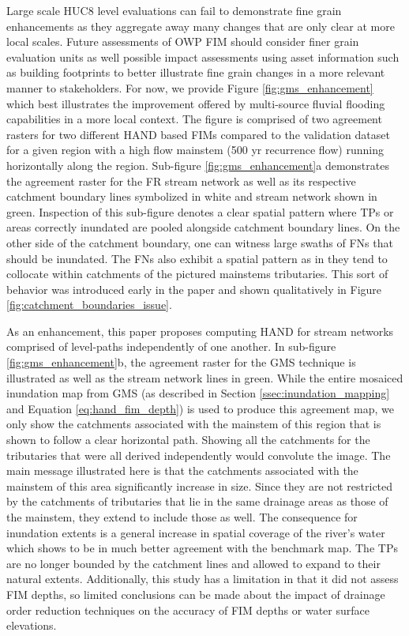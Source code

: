Large scale HUC8 level evaluations can fail to demonstrate fine grain enhancements as they aggregate away many changes that are only clear at more local scales.
Future assessments of OWP FIM should consider finer grain evaluation units as well possible impact assessments using asset information such as building footprints to better illustrate fine grain changes in a more relevant manner to stakeholders.
For now, we provide Figure \ref{fig:gms_enhancement} which best illustrates the improvement offered by multi-source fluvial flooding capabilities in a more local context.
The figure is comprised of two agreement rasters for two different HAND based FIMs compared to the validation dataset for a given region with a high flow mainstem (500 yr recurrence flow) running horizontally along the region.
Sub-figure \ref{fig:gms_enhancement}a demonstrates the agreement raster for the FR stream network as well as its respective catchment boundary lines symbolized in white and stream network shown in green.
Inspection of this sub-figure denotes a clear spatial pattern where TPs or areas correctly inundated are pooled alongside catchment boundary lines. 
On the other side of the catchment boundary, one can witness large swaths of FNs that should be inundated. 
The FNs also exhibit a spatial pattern as in they tend to collocate within catchments of the pictured mainstems tributaries.
This sort of behavior was introduced early in the paper and shown qualitatively in Figure \ref{fig:catchment_boundaries_issue}.

As an enhancement, this paper proposes computing HAND for stream networks comprised of level-paths independently of one another.
In sub-figure \ref{fig:gms_enhancement}b, the agreement raster for the GMS technique is illustrated as well as the stream network lines in green.
While the entire mosaiced inundation map from GMS (as described in Section \ref{ssec:inundation_mapping} and Equation \ref{eq:hand_fim_depth}) is used to produce this agreement map, we only show the catchments associated with the mainstem of this region that is shown to follow a clear horizontal path.
Showing all the catchments for the tributaries that were all derived independently would convolute the image.
The main message illustrated here is that the catchments associated with the mainstem of this area significantly increase in size.
Since they are not restricted by the catchments of tributaries that lie in the same drainage areas as those of the mainstem, they extend to include those as well.
The consequence for inundation extents is a general increase in spatial coverage of the river's water which shows to be in much better agreement with the benchmark map.
The TPs are no longer bounded by the catchment lines and allowed to expand to their natural extents.
Additionally, this study has a limitation in that it did not assess FIM depths, so limited conclusions can be made about the impact of drainage order reduction techniques on the accuracy of FIM depths or water surface elevations.

